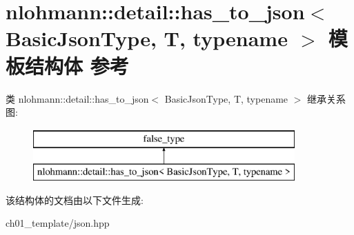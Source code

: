 \hypertarget{structnlohmann_1_1detail_1_1has__to__json}{}\section{nlohmann\+::detail\+::has\+\_\+to\+\_\+json$<$ Basic\+Json\+Type, T, typename $>$ 模板结构体 参考}
\label{structnlohmann_1_1detail_1_1has__to__json}
类 nlohmann\+::detail\+::has\+\_\+to\+\_\+json$<$ Basic\+Json\+Type, T, typename $>$ 继承关系图\+:\begin{figure}[H]
\begin{center}
\leavevmode
\includegraphics[height=2.000000cm]{structnlohmann_1_1detail_1_1has__to__json}
\end{center}
\end{figure}


该结构体的文档由以下文件生成\+:\begin{DoxyCompactItemize}
\item 
ch01\+\_\+template/json.\+hpp\end{DoxyCompactItemize}
